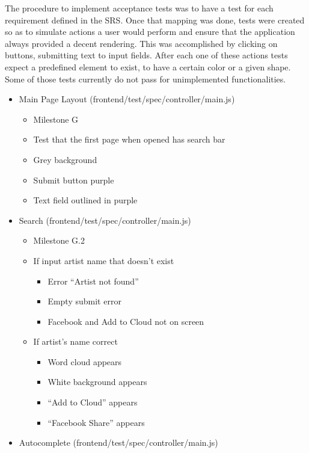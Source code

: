 \documentclass[]{article}
\begin{document}
The procedure to implement acceptance tests was to have a test for each
requirement defined in the SRS. Once that mapping was done, tests were
created so as to simulate actions a user would perform and ensure that
the application always provided a decent rendering. This was
accomplished by clicking on buttons, submitting text to input fields.
After each one of these actions tests expect a predefined element to
exist, to have a certain color or a given shape. Some of those tests
currently do not pass for unimplemented functionalities.

\begin{itemize}
\itemsep1pt\parskip0pt
\item
  Main Page Layout (frontend/test/spec/controller/main.js)

  \begin{itemize}
  \itemsep1pt\parskip0pt
  \item
    Milestone G
  \item
    Test that the first page when opened has search bar
  \item
    Grey background
  \item
    Submit button purple
  \item
    Text field outlined in purple
  \end{itemize}
\item
  Search (frontend/test/spec/controller/main.js)

  \begin{itemize}
  \itemsep1pt\parskip0pt
  \item
    Milestone G.2
  \item
    If input artist name that doesn't exist

    \begin{itemize}
    \itemsep1pt\parskip0pt
    \item
      Error ``Artist not found''
    \item
      Empty submit error
    \item
      Facebook and Add to Cloud not on screen
    \end{itemize}
  \item
    If artist's name correct

    \begin{itemize}
    \itemsep1pt\parskip0pt
    \item
      Word cloud appears
    \item
      White background appears
    \item
      ``Add to Cloud'' appears
    \item
      ``Facebook Share'' appears
    \end{itemize}
  \end{itemize}
\item
  Autocomplete (frontend/test/spec/controller/main.js)


\end{itemize}
\end{document}

